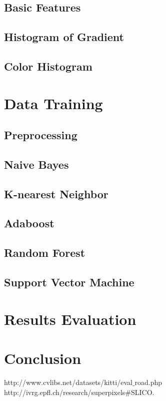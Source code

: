 \documentclass[paper=letter, fontsize=11pt]{scrartcl}
\numberwithin{equation}{section}		%
\numberwithin{figure}{section}			%
\numberwithin{table}{section}				%
\begin{document}
\subsection{Basic Features}
\subsection{Histogram of Gradient}
\subsection{Color Histogram}

\section{Data Training}
\subsection{Preprocessing}
\subsection{Naive Bayes}
\subsection{K-nearest Neighbor}
\subsection{Adaboost}
\subsection{Random Forest}
\subsection{Support Vector Machine}

\section{Results Evaluation}

\section{Conclusion}


\begin{thebibliography}{9}

  http://www.cvlibs.net/datasets/kitti/eval$\_$road.php
  http://ivrg.epfl.ch/research/superpixels$\#$SLICO. 
\end{thebibliography}
\end{document}
